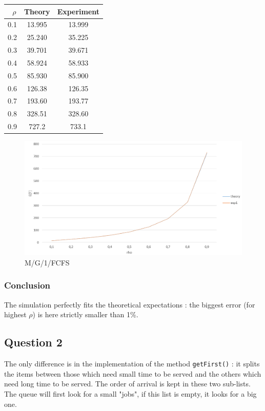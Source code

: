 \documentclass[a4paper]{report}
\begin{document}
\begin{center}
\begin{tabular}{|c|c|c|}

\hline
\ $\rho$ & \textbf{Theory} & \textbf{Experiment}  \\
\hline
0.1 & 13.995 & 13.999  \\
\hline
0.2 & 25.240 & 35.225  \\
\hline
0.3 & 39.701 & 39.671  \\
\hline
0.4 & 58.924 & 58.933  \\
\hline
0.5 & 85.930 & 85.900  \\
\hline
0.6 & 126.38 & 126.35  \\
\hline
0.7 & 193.60 & 193.77  \\
\hline
0.8 & 328.51 & 328.60  \\
\hline
0.9 & 727.2 & 733.1  \\
\hline

\end{tabular}
\end{center}

\begin{figure}[ht]
\begin{center}
\includegraphics[scale=.5]{FCFS.PNG}
\end{center}
\caption{M/G/1/FCFS}
\end{figure}

\subsubsection{Conclusion}
The simulation perfectly fits the theoretical expectations : the biggest error (for highest $\rho$) is here strictly smaller than 1\%.
\newpage
\subsection*{Question 2}
The only difference is in the implementation of the method \texttt{getFirst()} : it splits the items between those which need small time to be served and the others which need long time to be served. The order of arrival is kept in these two sub-lists. The queue will first look for a small "jobs", if this list is empty, it looks for a big one.
\end{document}
